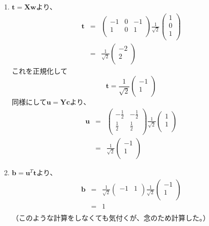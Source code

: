 \begin{enumerate}
\item \({\mathbf t} = {\mathbf X}{\mathbf w}\)より、
\begin{eqnarray*}
{\mathbf t} 
& = &  
\left(
\begin{array}{rrr}
-1 & 0 & -1 \\
 1 & 0 &  1 \\
\end{array}
\right)
\frac{1}{\sqrt{2}}
\left(
\begin{array}{r}
1 \\
0 \\
1 \\
\end{array}
\right)\\
& = &
\frac{1}{\sqrt{2}}
\left(
\begin{array}{r}
-2 \\
 2 \\
\end{array}
\right)
\end{eqnarray*}
これを正規化して
\[
{\mathbf t} =  
\frac{1}{\sqrt{2}}
\left(
\begin{array}{r}
-1 \\
 1 \\
\end{array}
\right)
\]
同様にして\({\mathbf u} = {\mathbf Y}{\mathbf c}\)より、
\begin{eqnarray*}
{\mathbf u} 
& = &  
\left(
\begin{array}{rr}
-\frac{1}{2} & -\frac{1}{2} \\
\frac{1}{2} & \frac{1}{2} \\
\end{array}
\right)
\frac{1}{\sqrt{2}}
\left(
\begin{array}{r}
1 \\
1 \\
\end{array}
\right)\\
& = &
\frac{1}{\sqrt{2}}
\left(
\begin{array}{rrr}
-1 \\
 1 \\
\end{array}
\right)
\end{eqnarray*}

\item \({\mathbf b} = {\mathbf u}^T{\mathbf t}\)より、
\begin{eqnarray*}
{\mathbf b} & = & 
\frac{1}{\sqrt{2}}
\left(
\begin{array}{rr}
-1 & 1 \\
\end{array}
\right)
\frac{1}{\sqrt{2}}
\left(
\begin{array}{r}
-1 \\
 1 \\
\end{array}
\right) \\
& = & 1\\
\end{eqnarray*}
（このような計算をしなくても気付くが、念のため計算した。）


\end{enumerate}
